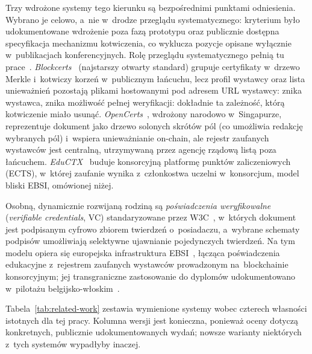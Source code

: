 Trzy wdrożone systemy tego kierunku są bezpośrednimi punktami odniesienia.
Wybrano je celowo, a~nie w~drodze przeglądu systematycznego: kryterium było
udokumentowane wdrożenie poza fazą prototypu oraz publicznie dostępna
specyfikacja mechanizmu kotwiczenia, co wyklucza pozycje opisane wyłącznie
w~publikacjach konferencyjnych. Rolę przeglądu systematycznego pełnią
tu prace~\cite{alammary2019,rustemi2023}.
\emph{Blockcerts}~\cite{blockcerts} (najstarszy otwarty standard)
grupuje certyfikaty w~drzewo Merkle i~kotwiczy korzeń w~publicznym łańcuchu,
lecz profil wystawcy oraz lista unieważnień pozostają plikami hostowanymi pod
adresem URL wystawcy: znika wystawca, znika możliwość pełnej weryfikacji:
dokładnie ta zależność, którą kotwiczenie miało usunąć.
\emph{OpenCerts}~\cite{opencerts}, wdrożony narodowo w~Singapurze, reprezentuje
dokument jako drzewo solonych skrótów pól (co umożliwia redakcję wybranych pól)
i~wspiera unieważnianie on-chain, ale rejestr zaufanych wystawców jest centralną,
utrzymywaną przez agencję rządową listą poza łańcuchem.
\emph{EduCTX}~\cite{eductx2018} buduje konsorcyjną platformę punktów
zaliczeniowych (ECTS), w~której zaufanie wynika z~członkostwa uczelni
w~konsorcjum, model bliski EBSI, omówionej niżej.

Osobną, dynamicznie rozwijaną rodziną są \emph{poświadczenia weryfikowalne}
(\emph{verifiable credentials}, VC) standaryzowane przez W3C~\cite{w3c-vc},
w~których dokument jest podpisanym cyfrowo zbiorem twierdzeń o~posiadaczu,
a~wybrane schematy podpisów umożliwiają selektywne ujawnianie pojedynczych
twierdzeń. Na tym modelu opiera się europejska infrastruktura
EBSI~\cite{ebsi}, łącząca poświadczenia edukacyjne z~rejestrem zaufanych
wystawców prowadzonym na~blockchainie konsorcyjnym; jej transgraniczne
zastosowanie do dyplomów udokumentowano w~pilotażu belgijsko-włoskim~\cite{tan2023}.

Tabela~\ref{tab:related-work} zestawia wymienione systemy wobec czterech
własności istotnych dla tej pracy. Kolumna wersji jest konieczna, ponieważ
oceny dotyczą konkretnych, publicznie udokumentowanych wydań; nowsze
warianty niektórych z~tych systemów wypadłyby inaczej.

